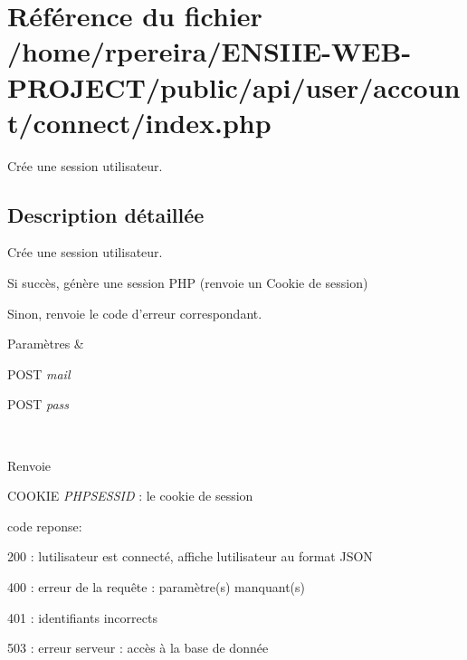 \hypertarget{account_2connect_2index_8php}{}\section{Référence du fichier /home/rpereira/\+E\+N\+S\+I\+I\+E-\/\+W\+E\+B-\/\+P\+R\+O\+J\+E\+C\+T/public/api/user/account/connect/index.php}
\label{account_2connect_2index_8php}


Crée une session utilisateur.  




\subsection{Description détaillée}
Crée une session utilisateur. 

Si succès, génère une session P\+HP (renvoie un Cookie de session) \begin{DoxyVerb}    Sinon, renvoie le code d'erreur correspondant.
\end{DoxyVerb}
 
\begin{DoxyParams}{Paramètres}
{\em } & 
\begin{DoxyItemize}
\item P\+O\+ST {\itshape mail} 
\item P\+O\+ST {\itshape pass} 
\end{DoxyItemize}\\
\hline
\end{DoxyParams}
\begin{DoxyReturn}{Renvoie}

\begin{DoxyItemize}
\item C\+O\+O\+K\+IE {\itshape P\+H\+P\+S\+E\+S\+S\+ID} \+: le cookie de session
\item code reponse\+:
\begin{DoxyItemize}
\item 200 \+: l\textquotesingle{}utilisateur est connecté, affiche l\textquotesingle{}utilisateur au format J\+S\+ON
\item 400 \+: erreur de la requête \+: paramètre(s) manquant(s)
\item 401 \+: identifiants incorrects
\item 503 \+: erreur serveur \+: accès à la base de donnée 
\end{DoxyItemize}
\end{DoxyItemize}
\end{DoxyReturn}
